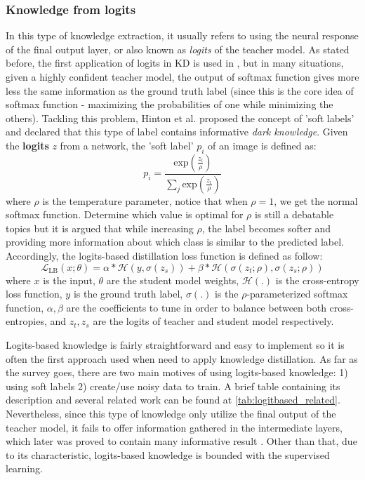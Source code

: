 \subsubsection{Knowledge from logits}
In this type of knowledge extraction, it usually refers to using the neural response of the final output layer, or also known as \textit{logits} of the teacher model. As stated before, the first application of logits in KD is used in \cite{firstkdpaper}, but in many situations, given a highly confident teacher model, the output of softmax function gives more less the same information as the ground truth label (since this is the core idea of softmax function - maximizing the probabilities of one while minimizing the others). Tackling this problem, Hinton et al. \cite{hintonfirstkd} proposed the concept of 'soft labels' and declared that this type of label contains informative \textit{dark knowledge}. Given the \textbf{logits} $z$ from a network, the 'soft label' $p_i$ of an image is defined as:
\[
   p_i = \frac{\text{exp}(\frac{z_i}{\rho})}{\sum_j \text{exp}(\frac{z_i}{\rho})}
\]
where $\rho$ is the temperature parameter, notice that when $\rho=1$, we get the normal softmax function. Determine which value is optimal for $\rho$ is still a debatable topics but it is argued that while increasing $\rho$, the label becomes softer and providing more information about which class is similar to the predicted label. Accordingly, the logits-based distillation loss function is defined as follow:
\[
   \mathcal{L}_{\text{LB}}(x;\theta) = \alpha * \mathcal{H}(y, \sigma(z_s)) + \beta * \mathcal{H}(\sigma(z_t;\rho), \sigma(z_s;\rho))
\]
where $x$ is the input, $\theta$ are the student model weights, $\mathcal{H}(.)$ is the cross-entropy loss function, $y$ is the ground truth label, $\sigma(.)$ is the $\rho$-parameterized softmax function, $\alpha, \beta$ are the coefficients to tune in order to balance between both cross-entropies, and $z_t, z_s$ are the logits of teacher and student model respectively.

Logits-based knowledge is fairly straightforward and easy to implement so it is often the first approach used when need to apply knowledge distillation. As far as the survey goes, there are two main motives of using logits-based knowledge: 1) using soft labels 2) create/use noisy data to train. A brief table containing its description and several related work can be found at \ref{tab:logitbased_related}. Nevertheless, since this type of knowledge only utilize the final output of the teacher model, it fails to offer information gathered in the intermediate layers, which later was proved to contain many informative result \cite{featurebased01}. Other than that, due to its characteristic, logits-based knowledge is bounded with the supervised learning.

